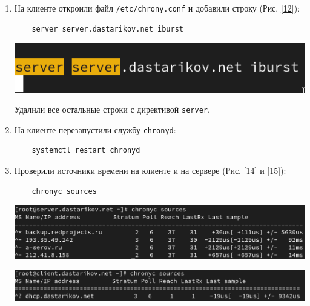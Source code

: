\begin{enumerate}
\item На клиенте откроили файл \texttt{/etc/chrony.conf} и добавили строку (Рис. \ref{12}):
  \begin{verbatim}
    server server.dastarikov.net iburst
  \end{verbatim}
\begin{center}
    \centering
    \includegraphics[width=\textwidth]{../images/image12.png}
    \label{12}
\end{center}

  Удалили все остальные строки с директивой \texttt{server}.
\item На клиенте перезапустили службу \texttt{chronyd}:
  \begin{verbatim}
    systemctl restart chronyd
  \end{verbatim}

\item Проверили источники времени на клиенте и на сервере (Рис. \ref{14} и \ref{15}):
  \begin{verbatim}
    chronyc sources
  \end{verbatim}
\begin{center}
    \centering
    \includegraphics[width=\textwidth]{../images/image14.png}
    \label{14}
\end{center}

\begin{center}
    \centering
    \includegraphics[width=\textwidth]{../images/image15.png}
    \label{15}
\end{center}

\end{enumerate}

